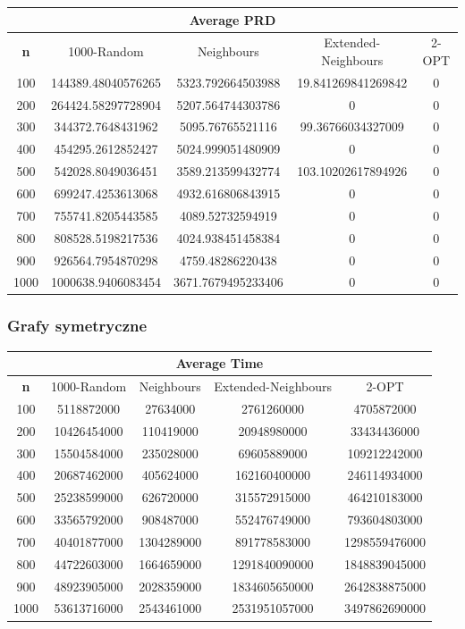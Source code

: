 \documentclass{article}
\begin{document}
\begin{center}
\begin{tabular}{|c|c|c|c|c|}
\hline
\multicolumn{5}{|c|}{\textbf{Average PRD}}\\
\hline
\textbf{n} & 1000-Random & Neighbours & Extended-Neighbours & 2-OPT\\
\hline
100 & 144389.48040576265 & 5323.792664503988 & 19.841269841269842 & 0\\
\hline
200 & 264424.58297728904 & 5207.564744303786 & 0 & 0\\
\hline
300 & 344372.7648431962 & 5095.76765521116 & 99.36766034327009 & 0\\
\hline
400 & 454295.2612852427 & 5024.999051480909 & 0 & 0\\
\hline
500 & 542028.8049036451 & 3589.213599432774 & 103.10202617894926 & 0\\
\hline
600 & 699247.4253613068 & 4932.616806843915 & 0 & 0\\
\hline
700 & 755741.8205443585 & 4089.52732594919 & 0 & 0\\
\hline
800 & 808528.5198217536 & 4024.938451458384 & 0 & 0\\
\hline
900 & 926564.7954870298 & 4759.48286220438 & 0 & 0\\
\hline
1000 & 1000638.9406083454 & 3671.7679495233406 & 0 & 0\\
\hline
\end{tabular}
\end{center}


\subsubsection{Grafy symetryczne}

\begin{center}
\begin{tabular}{|c|c|c|c|c|}
\hline
\multicolumn{5}{|c|}{\textbf{Average Time}}\\
\hline
\textbf{n} & 1000-Random & Neighbours & Extended-Neighbours & 2-OPT\\
\hline
100 & 5118872000 & 27634000 & 2761260000 & 4705872000\\
\hline
200 & 10426454000 & 110419000 & 20948980000 & 33434436000\\
\hline
300 & 15504584000 & 235028000 & 69605889000 & 109212242000\\
\hline
400 & 20687462000 & 405624000 & 162160400000 & 246114934000\\
\hline
500 & 25238599000 & 626720000 & 315572915000 & 464210183000\\
\hline
600 & 33565792000 & 908487000 & 552476749000 & 793604803000\\
\hline
700 & 40401877000 & 1304289000 & 891778583000 & 1298559476000\\
\hline
800 & 44722603000 & 1664659000 & 1291840090000 & 1848839045000\\
\hline
900 & 48923905000 & 2028359000 & 1834605650000 & 2642838875000\\
\hline
1000 & 53613716000 & 2543461000 & 2531951057000 & 3497862690000\\
\hline
\end{tabular}
\end{center}
\end{document}
